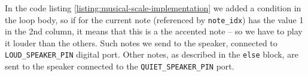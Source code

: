 \documentclass[../sparc.tex]{subfiles}
\begin{document}
In the code listing \ref{listing:musical-scale-implementation} we added a
condition in the loop body, so if for the current note (referenced by
\texttt{note\_idx}) has the value 1 in the 2nd column, it means that this is a
the accented note -- so we have to play it louder than the others.  Such notes we
send to the speaker, connected to \texttt{LOUD\_SPEAKER\_PIN} digital port.
Other notes, as described in the \texttt{else} block, are sent to the speaker
connected to the \texttt{QUIET\_SPEAKER\_PIN} port.
\end{document}
